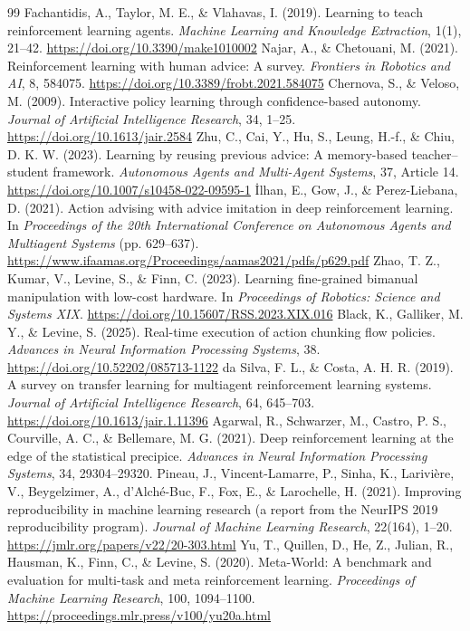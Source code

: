 \begin{thebibliography}{99}
 Fachantidis, A., Taylor, M. E., \& Vlahavas, I. (2019). Learning to teach reinforcement learning agents. \emph{Machine Learning and Knowledge Extraction}, 1(1), 21--42. \url{https://doi.org/10.3390/make1010002}
 Najar, A., \& Chetouani, M. (2021). Reinforcement learning with human advice: A survey. \emph{Frontiers in Robotics and AI}, 8, 584075. \url{https://doi.org/10.3389/frobt.2021.584075}
 Chernova, S., \& Veloso, M. (2009). Interactive policy learning through confidence-based autonomy. \emph{Journal of Artificial Intelligence Research}, 34, 1--25. \url{https://doi.org/10.1613/jair.2584}
 Zhu, C., Cai, Y., Hu, S., Leung, H.-f., \& Chiu, D. K. W. (2023). Learning by reusing previous advice: A memory-based teacher--student framework. \emph{Autonomous Agents and Multi-Agent Systems}, 37, Article 14. \url{https://doi.org/10.1007/s10458-022-09595-1}
 \.{I}lhan, E., Gow, J., \& Perez-Liebana, D. (2021). Action advising with advice imitation in deep reinforcement learning. In \emph{Proceedings of the 20th International Conference on Autonomous Agents and Multiagent Systems} (pp. 629--637). \url{https://www.ifaamas.org/Proceedings/aamas2021/pdfs/p629.pdf}
 Zhao, T. Z., Kumar, V., Levine, S., \& Finn, C. (2023). Learning fine-grained bimanual manipulation with low-cost hardware. In \emph{Proceedings of Robotics: Science and Systems XIX}. \url{https://doi.org/10.15607/RSS.2023.XIX.016}
 Black, K., Galliker, M. Y., \& Levine, S. (2025). Real-time execution of action chunking flow policies. \emph{Advances in Neural Information Processing Systems}, 38. \url{https://doi.org/10.52202/085713-1122}
 da Silva, F. L., \& Costa, A. H. R. (2019). A survey on transfer learning for multiagent reinforcement learning systems. \emph{Journal of Artificial Intelligence Research}, 64, 645--703. \url{https://doi.org/10.1613/jair.1.11396}
 Agarwal, R., Schwarzer, M., Castro, P. S., Courville, A. C., \& Bellemare, M. G. (2021). Deep reinforcement learning at the edge of the statistical precipice. \emph{Advances in Neural Information Processing Systems}, 34, 29304--29320. 
 Pineau, J., Vincent-Lamarre, P., Sinha, K., Larivi\`ere, V., Beygelzimer, A., d'Alch\'e-Buc, F., Fox, E., \& Larochelle, H. (2021). Improving reproducibility in machine learning research (a report from the NeurIPS 2019 reproducibility program). \emph{Journal of Machine Learning Research}, 22(164), 1--20. \url{https://jmlr.org/papers/v22/20-303.html}
 Yu, T., Quillen, D., He, Z., Julian, R., Hausman, K., Finn, C., \& Levine, S. (2020). Meta-World: A benchmark and evaluation for multi-task and meta reinforcement learning. \emph{Proceedings of Machine Learning Research}, 100, 1094--1100. \url{https://proceedings.mlr.press/v100/yu20a.html}


\end{thebibliography}
